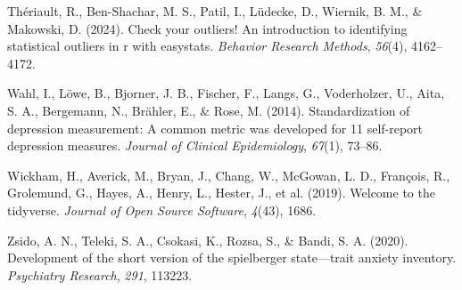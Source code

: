 \documentclass[
  jou,
  longtable,
  nolmodern,
  notxfonts,
  notimes,
  mask,
  colorlinks=true,linkcolor=blue,citecolor=blue,urlcolor=blue]{apa7}
\newlength{\cslhangindent}
\newenvironment{CSLReferences}[2] %
 {\begin{list}{}{%
  \setlength{\itemindent}{0pt}
  \setlength{\leftmargin}{0pt}
  \setlength{\parsep}{0pt}
  \ifodd #1
   \setlength{\leftmargin}{\cslhangindent}
   \setlength{\itemindent}{-1\cslhangindent}
  \fi
  \setlength{\itemsep}{#2\baselineskip}}}
 {\end{list}}
\begin{document}
\begin{CSLReferences}{1}{0}
Thériault, R., Ben-Shachar, M. S., Patil, I., Lüdecke, D., Wiernik, B.
M., \& Makowski, D. (2024). Check your outliers﻿! An introduction to
identifying statistical outliers in r with easystats. \emph{Behavior
Research Methods}, \emph{56}(4), 4162--4172.

Wahl, I., Löwe, B., Bjorner, J. B., Fischer, F., Langs, G., Voderholzer,
U., Aita, S. A., Bergemann, N., Brähler, E., \& Rose, M. (2014).
Standardization of depression measurement: A common metric was developed
for 11 self-report depression measures. \emph{Journal of Clinical
Epidemiology}, \emph{67}(1), 73--86.

Wickham, H., Averick, M., Bryan, J., Chang, W., McGowan, L. D.,
François, R., Grolemund, G., Hayes, A., Henry, L., Hester, J., et al.
(2019). Welcome to the tidyverse. \emph{Journal of Open Source
Software}, \emph{4}(43), 1686.

Zsido, A. N., Teleki, S. A., Csokasi, K., Rozsa, S., \& Bandi, S. A.
(2020). Development of the short version of the spielberger
state---trait anxiety inventory. \emph{Psychiatry Research}, \emph{291},
113223.

\end{CSLReferences}
\end{document}
